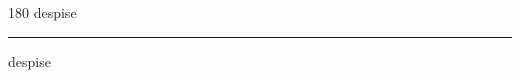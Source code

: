 
\begin{frame}
\begin{center}
\begin{turn}{180}
{\fontsize{2.5cm}{1em}\selectfont despise}
\end{turn}
\vspace{1em}\par  
\hrule
\vspace{1em}\par  
{\fontsize{2.5cm}{1em}\selectfont despise}
\end{center}
\end{frame}
